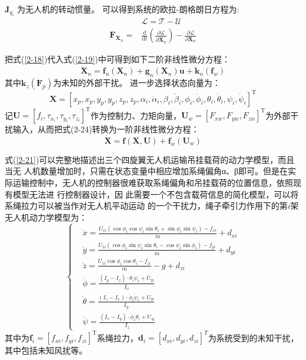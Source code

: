\documentclass[lang=chs, degree=master, blindreview=false, winfonts=true]{yanputhesis}
\begin{document}
$\boldsymbol{J}_{q_{i}}$ 为无人机的转动惯量。
可以得到系统的欧拉-朗格朗日方程为:
\begin{equation}
\begin{aligned}
	&\mathcal{L}=\mathcal{T}-\mathcal{U} \\
	\boldsymbol{F}_{\boldsymbol{X}_n}=&\frac{\mathrm{d}}{\mathrm{d}t}\left(\frac{\partial\mathcal{L}}{\partial\dot{\boldsymbol{X}_n}}\right)-\frac{\partial\mathcal{L}}{\partial\boldsymbol{X}_n}
\end{aligned}
\label{2-19}
\end{equation}


把式(\ref{2-18})代入式(\ref{2-19})中可得到如下二阶非线性微分方程：
\begin{equation}	
	\dot{\bm X}_n=\bm f_n(\bm X_n)+\bm g_n(\bm X_n)\bm u+\bm k_{n}\left(\bm f_{w}\right)
\end{equation}
其中$\bm k_{z}\left(\bm F_{p}\right)$为未知的外部干扰。
进一步选择状态向量为：$$\bm X=\left[x_{p},x_{p},y_{p},y_{p},z_{p},z_{p},\alpha_{i},\dot{\alpha}_{i},\beta_{i},\dot{\beta}_{i},\phi_{i},\dot{\phi}_{i},\theta_{i},\dot{\theta}_{i},\psi_{i},\dot{\psi}_{i}\right]^\mathrm{T}$$
记$\bm{U}=\left[f_i,\tau_{x_i},\tau_{y_i},\tau_{z_i}\right]^\mathrm{T}$作为控制力、力矩向量，${\boldsymbol{U}}_{w}=\left[F_{xw},F_{yw},F_{zw}\right]^\mathrm{T}$为外部干扰输入，从而把式(2-24)转换为一阶非线性微分方程：
\begin{equation}
	\dot{\boldsymbol{X}}=\bm f\left(\boldsymbol{X},\boldsymbol{U}\right)+\bm f_w\left(\boldsymbol{U}_w\right)
	\label{2-21}
\end{equation}

式(\ref{2-21})可以完整地描述出三个四旋翼无人机运输吊挂载荷的动力学模型，而且当无
人机数量增加时，只需在状态变量中相应增加系绳偏角α、β即可。但是在实际运输控制中，无人机的控制器很难获取系绳偏角和吊挂载荷的位置信息，依照现有模型无法进
行控制器设计，因
此需要一个不包含载荷信息的简化模型，可以将系绳拉力可以被当作对无人机平动运动
的一个干扰力，绳子牵引力作用下的第$i$架无人机动力学模型为： 
\begin{equation}
	\left\{
	\begin{aligned}
		&\ddot{x}=\frac{U_{1i}\left(\cos\phi_i\cos\psi_i\sin\theta_i+\sin\phi_i\sin\psi_i\right)-f_{xi}}{m}+d_{xi}\\
		&\ddot{y}=\frac{U_{1i}\left(\cos\phi_i\sin\psi_i\sin\theta_i-\cos\psi_i\sin\phi_i\right)-f_{yi}}{m}+d_{yi}\\
		&\ddot{z}=\frac{U_{1i}\cos\phi_i\cos\theta_i-f_{zi}}{m}-g+d_{zi}\\
		&\ddot{\phi}=\frac{(I_{y}-I_{z})\cdot \dot{\theta}_i\dot{\psi}_i+U_{2i}}{I_{x}}\\
		&\ddot{\theta}=\frac{(I_{z}-I_{x})\cdot \dot{\phi}_i\dot{\psi}_i+U_{3i}}{I_{y}}\\
		&\ddot{\psi}=\frac{(I_{x}-I_{y})\cdot \dot{\phi}_i\dot{\theta}_i+U_{4i}}{I_{z}}\end{aligned}
	\right.
	\label{2-22}
\end{equation}
其中为$\boldsymbol{f}_{i}=
\left[f_{xi} , f_{yi} , f_{zi}\right]^\mathrm{T}$系绳拉力，$\bm d_i=\left[d_{xi},d_{yi},d_{zi}\right]^T$为系统受到的未知干扰，其中包括未知风扰等。 
\end{document}
